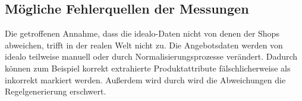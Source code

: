 \subsection{Mögliche Fehlerquellen der Messungen}
\label{subsec:fehlerquellen}

Die getroffenen Annahme, dass die idealo-Daten nicht von denen der Shops abweichen, trifft in der realen Welt nicht zu.
Die Angebotsdaten werden von idealo teilweise manuell oder durch Normalisierungsprozesse verändert.
Dadurch können zum Beispiel korrekt extrahierte Produktattribute fälschlicherweise als inkorrekt markiert werden.
Außerdem wird durch wird die Abweichungen die Regelgenerierung erschwert.